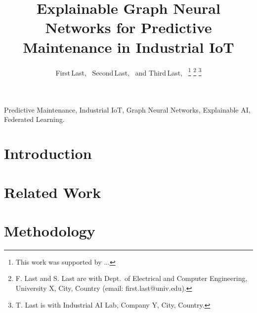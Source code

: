 \documentclass[journal]{IEEEtran}
\begin{document}
\title{Explainable Graph Neural Networks for Predictive Maintenance in Industrial IoT}

\author{First\,Last,~
        Second\,Last,~
        and Third\,Last,~
\thanks{This work was supported by ...}%
\thanks{F. Last and S. Last are with Dept.\ of Electrical and Computer Engineering, University X, City, Country (email: first.last@univ.edu).}%
\thanks{T. Last is with Industrial AI Lab, Company Y, City, Country.}%
}

\maketitle

\begin{abstract}
\end{abstract}

\begin{IEEEkeywords}
Predictive Maintenance, Industrial IoT, Graph Neural Networks, Explainable AI, Federated Learning.
\end{IEEEkeywords}

\IEEEpeerreviewmaketitle

\section{Introduction}
\label{sec:intro}

\section{Related Work}
\label{sec:related}

\section{Methodology}
\label{sec:method}
\end{document}
